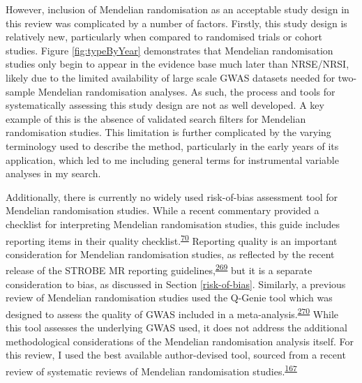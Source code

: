\documentclass[a4paper, twoside]{templates/ociamthesis}
\begin{document}
However, inclusion of Mendelian randomisation as an acceptable study design in this review was complicated by a number of factors. Firstly, this study design is relatively new, particularly when compared to randomised trials or cohort studies. Figure \ref{fig:typeByYear} demonstrates that Mendelian randomisation studies only begin to appear in the evidence base much later than NRSE/NRSI, likely due to the limited availability of large scale GWAS datasets needed for two-sample Mendelian randomisation analyses. As such, the process and tools for systematically assessing this study design are not as well developed. A key example of this is the absence of validated search filters for Mendelian randomisation studies. This limitation is further complicated by the varying terminology used to describe the method, particularly in the early years of its application, which led to me including general terms for instrumental variable analyses in my search.

Additionally, there is currently no widely used risk-of-bias assessment tool for Mendelian randomisation studies. While a recent commentary provided a checklist for interpreting Mendelian randomisation studies, this guide includes reporting items in their quality checklist.\textsuperscript{\protect\hyperlink{ref-davies2018}{70}} Reporting quality is an important consideration for Mendelian randomisation studies, as reflected by the recent release of the STROBE MR reporting guidelines,\textsuperscript{\protect\hyperlink{ref-skrivankova2021}{269}} but it is a separate consideration to bias, as discussed in Section \ref{risk-of-bias}. Similarly, a previous review of Mendelian randomisation studies used the Q-Genie tool which was designed to assess the quality of GWAS included in a meta-analysis.\textsuperscript{\protect\hyperlink{ref-sohani2015}{270}} While this tool assesses the underlying GWAS used, it does not address the additional methodological considerations of the Mendelian randomisation analysis itself. For this review, I used the best available author-devised tool, sourced from a recent review of systematic reviews of Mendelian randomisation studies.\textsuperscript{\protect\hyperlink{ref-spiga2021}{167}}
\end{document}
